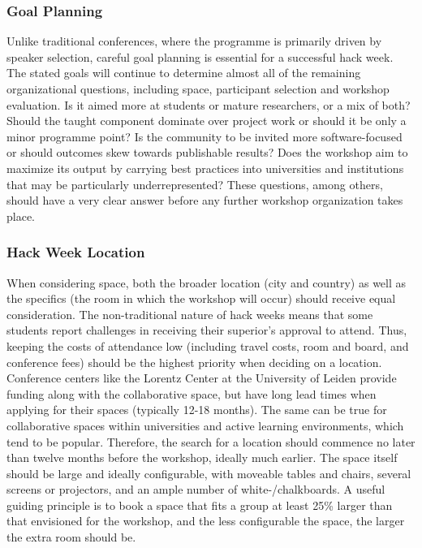 \documentclass{nature}
\begin{document}
\subsubsection{Goal Planning}
Unlike traditional conferences, where the programme is primarily driven by speaker selection, careful goal planning is essential for a successful hack week. The stated goals will continue to determine almost all of the remaining organizational questions, including space, participant selection and workshop evaluation. Is it aimed more at students or mature researchers, or a mix of both? Should the taught component dominate over project work or should it be only a minor programme point? Is the community to be invited more software-focused or should outcomes skew towards publishable results? Does the workshop aim to maximize its output by carrying best practices into universities and institutions that may be particularly underrepresented? These questions, among others, should have a very clear answer before any further workshop organization takes place.

\subsubsection{Hack Week Location}
When considering space, both the broader location (city and country) as well as the specifics (the room in which the workshop will occur) should receive equal consideration. The non-traditional nature of hack weeks means that some students report challenges in receiving their superior's approval to attend. Thus, keeping the costs of attendance low (including travel costs, room and board, and conference fees) should be the highest priority when deciding on a location. Conference centers like the Lorentz Center at the University of Leiden provide funding along with the collaborative space, but have long lead times when applying for their spaces (typically 12-18 months). The same can be true for collaborative spaces within universities and active learning environments, which tend to be popular. Therefore, the search for a location should commence no later than twelve months before the workshop, ideally much earlier.
The space itself should be large and ideally configurable, with moveable tables and chairs, several screens or projectors, and an ample number of white-/chalkboards. A useful guiding principle is to book a space that fits a group at least 25\% larger than that envisioned for the workshop, and the less configurable the space, the larger the extra room should be.
\end{document}
